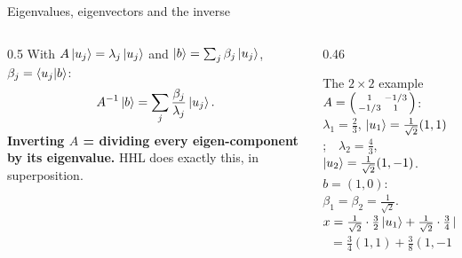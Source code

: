 \documentclass[aspectratio=169,11pt]{beamer}
\newcommand{\key}[1]{{\color{qdark}\textbf{#1}}}
\begin{document}
\begin{frame}{Eigenvalues, eigenvectors and the inverse}
  \begin{columns}[T]
    \begin{column}{0.5\textwidth}
      With $A\ket{u_j} = \lambda_j\ket{u_j}$ and $\ket b = \sum_j\beta_j\ket{u_j}$, $\beta_j = \braket{u_j|b}$:
      \[ A^{-1}\ket b = \sum_j\frac{\beta_j}{\lambda_j}\ket{u_j}. \]
      \key{Inverting $A$ = dividing every eigen-component by its eigenvalue.} HHL does exactly this, in superposition.
    \end{column}
    \begin{column}{0.46\textwidth}
      \begin{exampleblock}{The $2\times2$ example}
        $A = \begin{psmallmatrix}1&-1/3\\-1/3&1\end{psmallmatrix}$:\\
        $\lambda_1 = \frac23$, $\ket{u_1} = \frac{1}{\sqrt2}(1, 1)$;\ \ $\lambda_2 = \frac43$, $\ket{u_2} = \frac{1}{\sqrt2}(1, -1)$.\\
        $b = (1, 0)$: $\beta_1 = \beta_2 = \frac{1}{\sqrt2}$.\\[1mm]
        $x = \frac{1}{\sqrt2}\cdot\frac32\ket{u_1} + \frac{1}{\sqrt2}\cdot\frac34\ket{u_2}$\\
        $\phantom{x} = \frac34(1, 1) + \frac38(1, -1) = (\frac98, \frac38)$ \checkmark
      \end{exampleblock}
    \end{column}
  \end{columns}
\end{frame}
\end{document}
